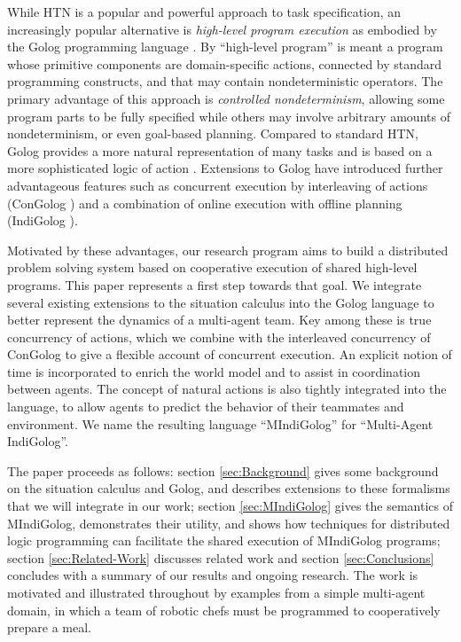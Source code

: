 \documentclass[times, 10pt, twocolumn]{article}
\begin{document}
While HTN is a popular and powerful approach to task specification,
an increasingly popular alternative is \emph{high-level program execution}
as embodied by the Golog programming language \cite{levesque97golog}.
By {}``high-level program'' is meant a program whose primitive components
are domain-specific actions, connected by standard programming constructs,
and that may contain nondeterministic operators. The primary advantage
of this approach is \emph{controlled nondeterminism}, allowing some
program parts to be fully specified while others may involve arbitrary
amounts of nondeterminism, or even goal-based planning. Compared to
standard HTN, Golog provides a more natural
representation of many tasks
and is based on a more sophisticated logic of action \cite{son00htn_golog}.
Extensions to Golog have introduced further advantageous
features such as concurrent execution by interleaving of actions (ConGolog \cite{giacomo00congolog})
and a combination of
online execution with offline planning (IndiGolog \cite{giacomo99indigolog}).

Motivated by these advantages, our research program aims to build
a distributed problem solving system based on cooperative execution
of shared high-level programs. This paper represents a first step
towards that goal. We integrate several existing extensions to the
situation calculus into the Golog language to better represent the
dynamics of a multi-agent team. Key among these is true concurrency
of actions, which we combine with the interleaved concurrency of ConGolog
to give a flexible account of concurrent execution. An explicit notion
of time is incorporated to enrich the world model and to assist in
coordination between agents. The concept of natural actions is also
tightly integrated into the language, to allow agents to predict the
behavior of their teammates and environment. We name the resulting
language {}``MIndiGolog'' for {}``Multi-Agent IndiGolog''.

The paper proceeds as follows: section \ref{sec:Background} gives
some background on the situation calculus and Golog, and describes
extensions to these formalisms that we will integrate in our work;
section \ref{sec:MIndiGolog} gives the semantics of MIndiGolog, demonstrates
their utility, and shows how techniques for distributed logic programming
can facilitate the shared execution of MIndiGolog programs; section
\ref{sec:Related-Work} discusses related work and section \ref{sec:Conclusions}
concludes with a summary of our results and ongoing research. The
work is motivated and illustrated throughout by examples from a simple
multi-agent domain, in which a team of robotic chefs must be programmed
to cooperatively prepare a meal.
\end{document}
